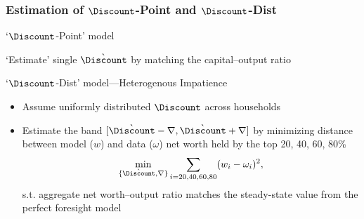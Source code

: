 \documentclass{beamer}
\newcommand{\jemph}[1]{{\color{jirkasred}#1}}
\begin{document}
\begin{frame}
\frametitle{Estimation of $\Discount$-Point and $\Discount$-Dist}

\begin{footnotesize}
\begin{block}{`$\Discount$-Point' model}
\bi
\item `Estimate' single $\grave{\Discount}$ by matching the capital--output ratio
\ei
\end{block}
\begin{block}{`$\Discount$-Dist' model---Heterogenous Impatience}
\begin{itemize}
\item Assume uniformly distributed $\Discount$ across households
\item Estimate the band $[\grave{\Discount}-\nabla,\grave{\Discount}+\nabla]$ by \jemph{minimizing distance between model ($w$) and data ($\omega$) net worth} held by the top 20, 40, 60, 80\%
        \begin{equation*}
        \underset{\{\grave{\Discount}, \nabla\}}{\min}\sum\limits_{i=20,40,60,80}(w_{i}-\omega _{i})^{2}\notag,
        \end{equation*}
        s.t. aggregate net worth--output ratio matches the steady-state value from the perfect foresight model\\[2mm]
\end{itemize}
\end{block}
\end{footnotesize}

\end{frame}
\end{document}
